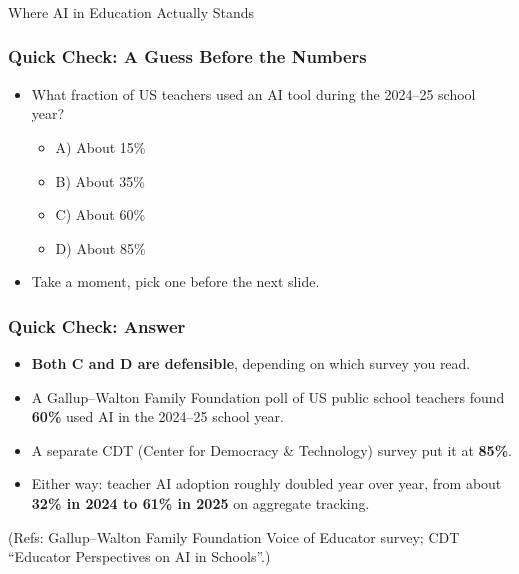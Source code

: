 \begin{frame}[fragile]\frametitle{}
\begin{center}
{\Large Where AI in Education Actually Stands}
\end{center}
\end{frame}

\begin{frame}[fragile]\frametitle{Quick Check: A Guess Before the Numbers}
\begin{itemize}
\item What fraction of US teachers used an AI tool during the 2024--25 school year?
\begin{itemize}
\item A) About 15\%
\item B) About 35\%
\item C) About 60\%
\item D) About 85\%
\end{itemize}
\item Take a moment, pick one before the next slide.
\end{itemize}
\end{frame}

\begin{frame}[fragile]\frametitle{Quick Check: Answer}
\begin{itemize}
\item \textbf{Both C and D are defensible}, depending on which survey you read.
\item A Gallup--Walton Family Foundation poll of US public school teachers found \textbf{60\%} used AI in the 2024--25 school year.
\item A separate CDT (Center for Democracy \& Technology) survey put it at \textbf{85\%}.
\item Either way: teacher AI adoption roughly doubled year over year, from about \textbf{32\% in 2024 to 61\% in 2025} on aggregate tracking.
\end{itemize}
{\tiny (Refs: Gallup--Walton Family Foundation Voice of Educator survey; CDT ``Educator Perspectives on AI in Schools''.)}
\end{frame}

